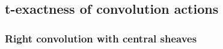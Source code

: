 \documentclass[11pt]{amsart}
\numberwithin{equation}{section}
\theoremstyle{plain}
\theoremstyle{definition}
\newtheorem{rmk}[thm]{Remark}
\renewcommand{\k}{\Bbbk}
\newcommand{\semi}{{{\frac{\infty}{2}}}}
\begin{document}
%

\subsection{t-exactness of convolution actions}

\subsubsection{Right convolution with central sheaves}
\end{document}

